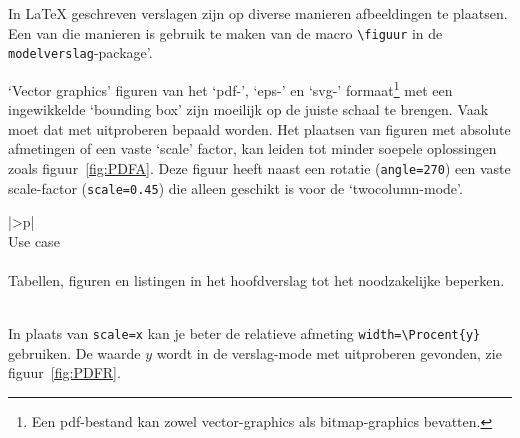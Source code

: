 		In \LaTeX{}\cite{lam1994} geschreven verslagen zijn op diverse manieren
		afbeeldingen\cite{Oos1996} te plaatsen. Een van die manieren is gebruik te
		maken van de macro \verb!\figuur! in de \verb!modelverslag!-package'.
		
		`Vector graphics' figuren van het `pdf-', `eps-' en `svg-'
		formaat\footnote{Een pdf-bestand kan zowel vector-graphics als
			bitmap-graphics bevatten.} met een ingewikkelde `bounding box' zijn
		moeilijk op de juiste schaal te brengen. Vaak moet dat met uitproberen
		bepaald worden. Het plaatsen van figuren met absolute afmetingen of
		een vaste `scale' factor, kan leiden tot minder soepele oplossingen
		zoals figuur~\ref{fig:PDFA}. Deze figuur heeft naast een rotatie
		(\verb!angle=270!)  een vaste scale-factor (\verb!scale=0.45!) die
		alleen geschikt is voor de `twocolumn-mode'.
		
		
		
		\begin{center}
			\begin{tabular}{|>\C p{}|}
				\hline
				~\\
				Use case\\
				~\\
				Tabellen, figuren en listingen in het hoofdverslag tot het
				noodzakelijke beperken.\\
				~\\
				\hline
			\end{tabular}
		\end{center}
		
		
		
		
		\begin{center}
			
		\end{center}
		
		
		
		In plaats van \verb!scale=x! kan je beter de relatieve afmeting
		\verb!width=\Procent{y}! gebruiken. De waarde $y$ wordt in de
		verslag-mode met uitproberen gevonden, zie figuur~\ref{fig:PDFR}.
		
		\begin{center}
			
		\end{center}
		
